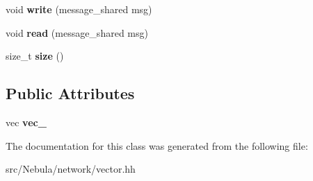 \begin{DoxyCompactItemize}
\item 
\hypertarget{classgal_1_1network_1_1vector__ext_ab6231dbee5d3773f8e6c6a2099686013}{void {\bfseries write} (message\-\_\-shared msg)}\label{classgal_1_1network_1_1vector__ext_ab6231dbee5d3773f8e6c6a2099686013}

\item 
\hypertarget{classgal_1_1network_1_1vector__ext_aca9774537b3edb25bb1fbb083aba630a}{void {\bfseries read} (message\-\_\-shared msg)}\label{classgal_1_1network_1_1vector__ext_aca9774537b3edb25bb1fbb083aba630a}

\item 
\hypertarget{classgal_1_1network_1_1vector__ext_a3c2f72e7208a18ccea1aa2f0b87985e2}{size\-\_\-t {\bfseries size} ()}\label{classgal_1_1network_1_1vector__ext_a3c2f72e7208a18ccea1aa2f0b87985e2}

\end{DoxyCompactItemize}
\subsection*{Public Attributes}
\begin{DoxyCompactItemize}
\item 
\hypertarget{classgal_1_1network_1_1vector__ext_ac14af4fb2f11ce5fe177384c10ea9f31}{vec {\bfseries vec\-\_\-}}\label{classgal_1_1network_1_1vector__ext_ac14af4fb2f11ce5fe177384c10ea9f31}

\end{DoxyCompactItemize}


The documentation for this class was generated from the following file\-:\begin{DoxyCompactItemize}
\item 
src/\-Nebula/network/vector.\-hh\end{DoxyCompactItemize}

